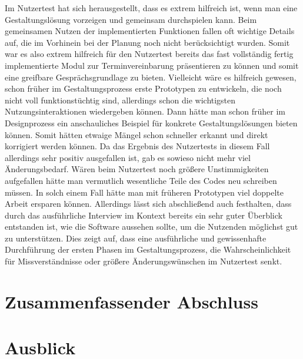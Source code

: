 Im Nutzertest hat sich herausgestellt, dass es extrem hilfreich ist, wenn man
eine Gestaltungslösung vorzeigen und gemeinsam durchspielen kann. Beim
gemeinsamen Nutzen der implementierten Funktionen fallen oft wichtige Details
auf, die im Vorhinein bei der Planung noch nicht berücksichtigt wurden. Somit
war es also extrem hilfreich für den Nutzertest bereits das fast vollständig
fertig implementierte Modul zur Terminvereinbarung präsentieren zu können und
somit eine greifbare Gesprächsgrundlage zu bieten. Vielleicht wäre es hilfreich
gewesen, schon früher im Gestaltungsprozess erste Prototypen zu entwickeln, die
noch nicht voll funktionstüchtig sind, allerdings schon die wichtigsten
Nutzungsinteraktionen wiedergeben können. Dann hätte man schon früher im
Designprozess ein anschauliches Beispiel für konkrete Gestaltungslösungen
bieten können. Somit hätten etwaige Mängel schon schneller erkannt und direkt
korrigiert werden können. Da das Ergebnis des Nutzertests in diesem Fall
allerdings sehr positiv ausgefallen ist, gab es sowieso nicht mehr viel
Änderungsbedarf. Wären beim Nutzertest noch größere Unstimmigkeiten aufgefallen
hätte man vermutlich wesentliche Teile des Codes neu schreiben müssen. In solch
einem Fall hätte man mit früheren Prototypen viel doppelte Arbeit ersparen
können. Allerdings lässt sich abschließend auch festhalten, dass durch das
ausführliche Interview im Kontext bereits ein sehr guter Überblick entstanden
ist, wie die Software aussehen sollte, um die Nutzenden möglichst gut zu
unterstützen. Dies zeigt auf, dass eine ausführliche und gewissenhafte
Durchführung der ersten Phasen im Gestaltungsprozess, die Wahrscheinlichkeit
für Missverständnisse oder größere Änderungswünschen im Nutzertest senkt.

\section{Zusammenfassender Abschluss}
\label{subsection:conclusion}

\section{Ausblick}
\label{subsection:outlook}

